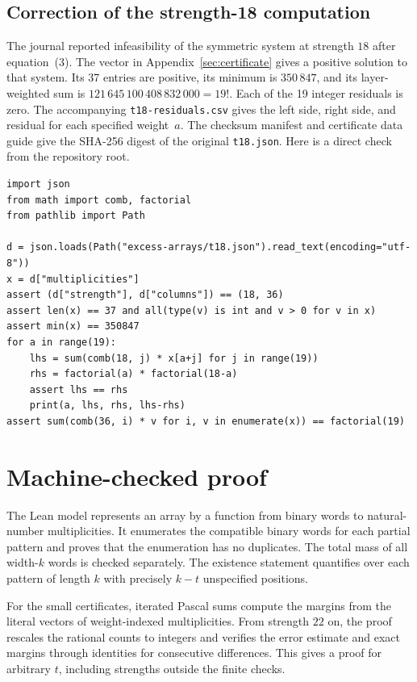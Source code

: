 \documentclass[11pt]{article}
\newcommand{\code}[1]{\texttt{#1}}
\begin{document}
\subsection{Correction of the strength-18 computation}
The journal reported infeasibility of the symmetric system at strength
\(18\) after equation~(3). The vector in Appendix~\ref{sec:certificate}
gives a positive solution to that system. Its 37 entries are positive,
its minimum is \(350\,847\), and its layer-weighted sum is
\(121\,645\,100\,408\,832\,000=19!\). Each of the 19 integer residuals
is zero. The accompanying \code{t18-residuals.csv} gives the left side,
right side, and residual for each specified weight~\(a\).
The checksum manifest and certificate data guide give the SHA-256 digest
of the original \code{t18.json}. Here is a direct check from the repository root.
\small
\begin{verbatim}
import json
from math import comb, factorial
from pathlib import Path

d = json.loads(Path("excess-arrays/t18.json").read_text(encoding="utf-8"))
x = d["multiplicities"]
assert (d["strength"], d["columns"]) == (18, 36)
assert len(x) == 37 and all(type(v) is int and v > 0 for v in x)
assert min(x) == 350847
for a in range(19):
    lhs = sum(comb(18, j) * x[a+j] for j in range(19))
    rhs = factorial(a) * factorial(18-a)
    assert lhs == rhs
    print(a, lhs, rhs, lhs-rhs)
assert sum(comb(36, i) * v for i, v in enumerate(x)) == factorial(19)
\end{verbatim}
\normalsize

\section{Machine-checked proof}\label{sec:lean}
The Lean model represents an array by a function from binary words to
natural-number multiplicities. It enumerates the compatible binary
words for each partial pattern and proves that the enumeration has no
duplicates. The total mass of all width-\(k\) words is checked separately.
The existence statement quantifies over each pattern of length \(k\)
with precisely \(k-t\) unspecified positions.

For the small certificates, iterated Pascal sums compute the margins
from the literal vectors of weight-indexed multiplicities. From
strength \(22\) on, the proof rescales the rational counts to integers
and verifies the error estimate and exact margins through identities
for consecutive differences. This gives a proof for arbitrary \(t\),
including strengths outside the finite checks.
\end{document}
